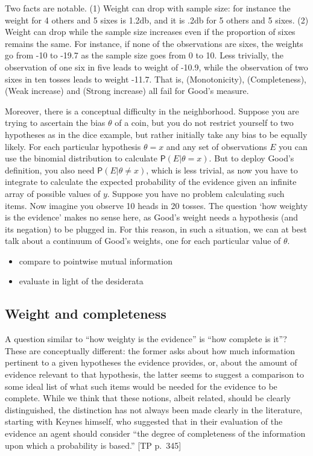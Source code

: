\documentclass[
  10pt,
  dvipsnames,enabledeprecatedfontcommands]{scrartcl}
\newcommand{\pr}[1]{\mathsf{P}(#1)}
\begin{document}
Two facts are notable. (1) Weight can drop with sample size: for
instance the weight for 4 others and 5 sixes is 1.2db, and it is .2db
for 5 others and 5 sixes. (2) Weight can drop while the sample size
increases even if the proportion of sixes remains the same. For
instance, if none of the observations are sixes, the weights go from -10
to -19.7 as the sample size goes from 0 to 10. Less trivially, the
observation of one six in five leads to weight of -10.9, while the
observation of two sixes in ten tosses leads to weight -11.7. That is,
(Monotonicity), (Completeness), (Weak increase) and (Strong increase)
all fail for Good's measure.

Moreover, there is a conceptual difficulty in the neighborhood. Suppose
you are trying to ascertain the bias \(\theta\) of a coin, but you do
not restrict yourself to two hypotheses as in the dice example, but
rather initially take any bias to be equally likely. For each particular
hypothesis \(\theta = x\) and any set of observations \(E\) you can use
the binomial distribution to calculate \(\pr{E \vert \theta = x}\). But
to deploy Good's definition, you also need
\(\pr{E \vert \theta \neq x}\), which is less trivial, as now you have
to integrate to calculate the expected probability of the evidence given
an infinite array of possible values of \(y\). Suppose you have no
problem calculating such items. Now imagine you observe 10 heads in 20
tosses. The question `how weighty is the evidence' makes no sense here,
as Good's weight needs a hypothesis (and its negation) to be plugged in.
For this reason, in such a situation, we can at best talk about a
continuum of Good's weights, one for each particular value of
\(\theta\).

\begin{itemize}
\item
  compare to pointwise mutual information
\item
  evaluate in light of the desiderata
\end{itemize}

\hypertarget{weight-and-completeness}{%
\subsection{Weight and completeness}\label{weight-and-completeness}}

A question similar to ``how weighty is the evidence'' is ``how complete
is it''? These are conceptually different: the former asks about how
much information pertinent to a given hypotheses the evidence provides,
or, about the amount of evidence relevant to that hypothesis, the latter
seems to suggest a comparison to some ideal list of what such items
would be needed for the evidence to be complete. While we think that
these notions, albeit related, should be clearly distinguished, the
distinction has not always been made clearly in the literature, starting
with Keynes himself, who suggested that in their evaluation of the
evidence an agent should consider ``the degree of completeness of the
information upon which a probability is based.'' {[}TP
p.~345{]}
\end{document}
